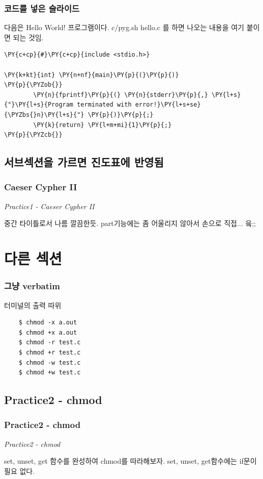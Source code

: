 \documentclass{beamer}
\begin{document}
\begin{frame}[fragile] %
	\frametitle{코드를 넣은 슬라이드}
	다음은 Hello World! 프로그램이다.
	c/pyg.sh hello.c 를 하면 나오는 내용을 여기 붙이면 되는 것임.

	\begin{Verbatim}[commandchars=\\\{\}]
\PY{c+cp}{#}\PY{c+cp}{include <stdio.h>}

\PY{k+kt}{int} \PY{n+nf}{main}\PY{p}{(}\PY{p}{)}
\PY{p}{\PYZob{}}
        \PY{n}{fprintf}\PY{p}{(} \PY{n}{stderr}\PY{p}{,} \PY{l+s}{"}\PY{l+s}{Program terminated with error!}\PY{l+s+se}{\PYZbs{}n}\PY{l+s}{"} \PY{p}{)}\PY{p}{;}
        \PY{k}{return} \PY{l+m+mi}{1}\PY{p}{;}
\PY{p}{\PYZcb{}}
\end{Verbatim}

\end{frame}

\subsection{서브섹션을 가르면 진도표에 반영됨}

\begin{frame}
	\frametitle{Caeser Cypher II}
	{\em \Large Practice1 - Caeser Cypher II}

	\vspace{5mm}
	중간 타이틀로서 나름 깔끔한듯.
	part기능에는 좀 어울리지 않아서 손으로 직접... 읔;;
\end{frame}

\section{다른 섹션}

\begin{frame}[containsverbatim]
	\frametitle{그냥 verbatim}
	터미널의 출력 따위
	\begin{verbatim}
	$ chmod -x a.out
	$ chmod +x a.out
	$ chmod -r test.c
	$ chmod +r test.c
	$ chmod -w test.c
	$ chmod +w test.c
	\end{verbatim}
\end{frame}

\subsection{Practice2 - chmod}

\begin{frame}
	\frametitle{Practice2 - chmod}
	{\em \Large Practice2 - chmod}

	\vspace{5mm}
	set, unset, get 함수를 완성하여 chmod를 따라해보자.
	set, unset, get함수에는 if문이 필요 없다.
\end{frame}
\end{document}
